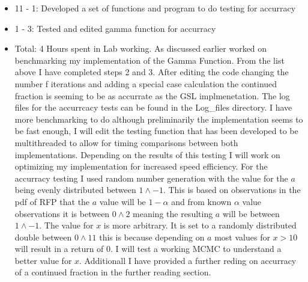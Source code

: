 \documentclass[12pt,hyperref]{labbook}
\begin{document}
\begin{itemize}
    \item 11 - 1: Developed a set of functions and program to do testing for accurracy
    \item 1 - 3: Tested and edited gamma function for accurracy
    \item Total: 4 Hours spent in Lab working.
As discussed earlier worked on benchmarking my implementation of the Gamma Function. From the list above I have completed steps 2 and 3. After editing the code changing the number f iterations and adding a special case calculation the continued fraction is seeming to be as accurrate as the GSL implmenetation. The log files for the accurrcacy tests can be found in the Log\_files directory.
I have more benchmarking to do although preliminarily the implementation seems to be fast enough, I will edit the testing function that has been developed to be multithreaded to allow for timing comparisons between both implementations. Depending on the results of this testing I will work on optimizing my implementation for increased speed efficiency. 
For the accurracy testing I used random number generation with the value for the $a$ being evenly distributed between $1 \land -1$. This is based on observations in the pdf of RFP that the $a$ value will be $1 - \alpha$ and from known $\alpha$ value observations it is between $0 \land 2$ meaning the resulting $a$ will be between $1 \land -1$. The value for $x$ is more arbitrary. It is set to a randomly distributed double between $0 \land 11$ this is because depending on $a$ most values for $x > 10$ will result in a return of $0$. I will test a working MCMC to understand a better value for $x$. Additionall I have provided a further reding on accurracy of a continued fraction in the further reading section.
\end{itemize}
\end{document}
